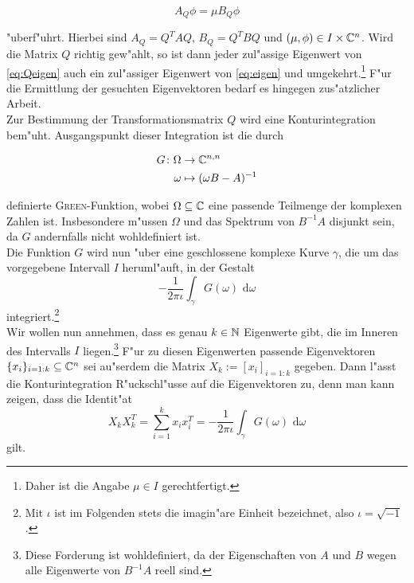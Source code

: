   \begin{equation}\label{eq:Qeigen}
  A_Q \phi = \mu B_Q \phi
  \end{equation}

"uberf"uhrt. Hierbei sind $A_Q = Q^TAQ$, $B_Q = Q^TBQ$ und $(\mu, \phi)
\in I\times\mathbb{C}^n$.
Wird die Matrix $Q$ richtig gew"ahlt, so ist dann jeder zul"assige Eigenwert von
\eqref{eq:Qeigen} auch ein zul"assiger Eigenwert von \eqref{eq:eigen} und
umgekehrt.\footnote{Daher ist die Angabe $\mu\in I$ gerechtfertigt.}
F"ur die Ermittlung der gesuchten Eigenvektoren bedarf es hingegen zus"atzlicher Arbeit.\\

Zur Bestimmung der Transformationsmatrix $Q$ wird eine Konturintegration bem"uht.
Ausgangspunkt dieser Integration ist die durch

  \begin{align*}
  G\colon\Omega &\to\mathbb{C}^{n,n}\\
  \omega &\mapsto (\omega B - A)^{-1}
  \end{align*}

definierte  \textsc{Green}-Funktion, wobei $\Omega \subseteq \mathbb{C}$ eine passende
Teilmenge der komplexen Zahlen ist. Insbesondere m"ussen $\Omega$ und das
Spektrum von $B^{-1}A$ disjunkt sein, da $G$ andernfalls nicht wohldefiniert ist.\\

Die Funktion $G$ wird nun "uber eine geschlossene komplexe Kurve $\gamma$,
die um das vorgegebene Intervall $I$ heruml"auft, in der Gestalt
\[
-\frac{1}{2\pi\iota}\int_\gamma G(\omega)\text{ d}\omega
\]
integriert.\footnote{Mit $\iota$ ist im Folgenden stets die imagin"are Einheit bezeichnet,
also $\iota = \sqrt{-1}$.}\\

Wir wollen nun annehmen,
dass es genau $k\in\mathbb{N}$ Eigenwerte gibt,
die im Inneren des Intervalls $I$ liegen.\footnote{Diese Forderung ist wohldefiniert, da
der Eigenschaften von $A$ und $B$ wegen alle Eigenwerte von $B^{-1}A$ reell sind.}
F"ur zu diesen Eigenwerten passende Eigenvektoren $\{x_i\}_{i=1:k} \subseteq \mathbb{C}^n$ sei au"serdem die Matrix
$X_k := [x_i]_{i=1:k}$ gegeben.
Dann l"asst die Konturintegration R"uckschl"usse auf die Eigenvektoren zu, denn man kann
zeigen, dass die Identit"at
\begin{equation}\label{eq:integral}
X_k X_k^T = \sum_{i=1}^k x_i x_i^T =
-\frac{1}{2\pi\iota}\int_\gamma G(\omega)\text{ d}\omega
\end{equation}
gilt.\\

